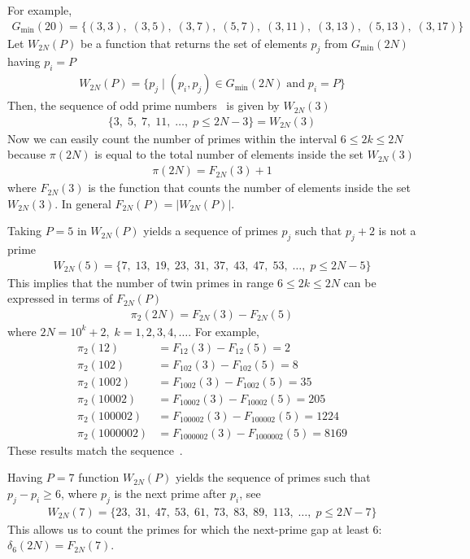 For example,
\begin{align*}
    G_{\min}(20) = \{
    (3,3),\;
    (3,5),\;
    (3,7),\;
    (5,7),\;
    (3,11),\;
    (3,13),\;
    (5,13),\;
    (3,17)
    \}
\end{align*}
Let $W_{2N}(P)$ be a function that returns the set of elements $p_j$ from $G_{\min} (2N)$ having $p_i=P$
\begin{align*}
    W_{2N}(P) = \{p_j \mid (p_i, p_j) \in G_{\min} (2N) \; \mathrm{and} \; p_i = P \}
\end{align*}
Then, the sequence of odd prime numbers~\cite{oeis:A065091} is given by $W_{2N}(3)$
\begin{align*}
    \{ 3, \; 5, \; 7, \; 11, \; \dots, \; p \leq 2N - 3\} = W_{2N}(3)
\end{align*}
Now we can easily count the number of primes within the interval $6 \leq 2k \leq 2N$ because $\pi(2N)$ is equal to
the total number of elements inside the set $W_{2N}(3)$
\begin{align*}
    \pi(2N) = F_{2N}(3) + 1
\end{align*}
where $F_{2N}(3)$ is the function that counts the number of elements inside the set $W_{2N}(3)$.
In general $F_{2N}(P) = |W_{2N}(P)|$.

Taking $P=5$ in $W_{2N}(P)$ yields a sequence of primes $p_j$ such that $p_j+2$ is not a prime~\cite{oeis:A049591}
\begin{align*}
    W_{2N}(5) = \{ 7, \; 13, \; 19, \; 23, \; 31, \; 37, \; 43, \; 47, \; 53, \; \dots, \;  p \leq 2N - 5 \}
\end{align*}
This implies that the number of twin primes in range $6 \leq 2k \leq 2N$ can be expressed in terms of $F_{2N}(P)$
\begin{align*}
    \pi_2 (2N) = F_{2N}(3) - F_{2N}(5)
\end{align*}
where $2N=10^k+2, \; k=1,2,3,4,\dots$.
For example,
\begin{align*}
    \pi_2 (12) &= F_{12}(3) - F_{12}(5) = 2 \\
    \pi_2 (102) &= F_{102}(3) - F_{102}(5) = 8 \\
    \pi_2 (1002) &= F_{1002}(3) - F_{1002}(5) = 35 \\
    \pi_2 (10002) &= F_{10002}(3) - F_{10002}(5) = 205 \\
    \pi_2 (100002) &= F_{100002}(3) - F_{100002}(5) = 1224 \\
    \pi_2 (1000002) &= F_{1000002}(3) - F_{1000002}(5) = 8169
\end{align*}
These results match the sequence~\cite{oeis_A007508}.

Having $P=7$ function $W_{2N}(P)$ yields the sequence of primes such that $p_j-p_i \geq 6$,
where $p_j$ is the next prime after $p_i$, see~\cite{oeis:A124582}
\begin{align*}
    W_{2N}(7) = \{ 23, \; 31, \;  47, \; 53, \; 61, \;  73, \; 83, \; 89, \; 113, \; \dots, \; p \leq 2N-7 \}
\end{align*}
This allows us to count the primes for which the next-prime gap at least 6: $\delta_6(2N) = F_{2N}(7)$.
